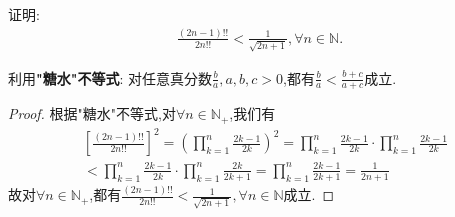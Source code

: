 \documentclass[../../main.tex]{subfiles}
\begin{document}
\begin{example}
证明:\begin{align*}
\frac{\left( 2n-1 \right) !!}{2n!!}<\frac{1}{\sqrt{2n+1}},\forall n\in \mathbb{N} .
\end{align*}
\end{example}
\begin{note}
利用\hypertarget{"糖水"不等式}{\textbf{"糖水"不等式}}:
对任意真分数$\frac{b}{a},a,b,c>0$,都有$\frac{b}{a}<\frac{b+c}{a+c}$成立.
\end{note}
\begin{proof}
根据\hypertarget{"糖水"不等式}{"糖水"不等式},对$\forall n\in \mathbb{N}_+$,我们有
\begin{align*}
&\left[ \frac{\left( 2n-1 \right) !!}{2n!!} \right] ^2=\left( \prod_{k=1}^n{\frac{2k-1}{2k}} \right) ^2=\prod_{k=1}^n{\frac{2k-1}{2k}}\cdot \prod_{k=1}^n{\frac{2k-1}{2k}}
\\
&<\prod_{k=1}^n{\frac{2k-1}{2k}}\cdot \prod_{k=1}^n{\frac{2k}{2k+1}}=\prod_{k=1}^n{\frac{2k-1}{2k+1}}=\frac{1}{2n+1}
\end{align*}
故对$\forall n\in \mathbb{N}_+$,都有$\frac{\left( 2n-1 \right) !!}{2n!!}<\frac{1}{\sqrt{2n+1}},\forall n\in \mathbb{N}$成立.

\end{proof}
\end{document}
